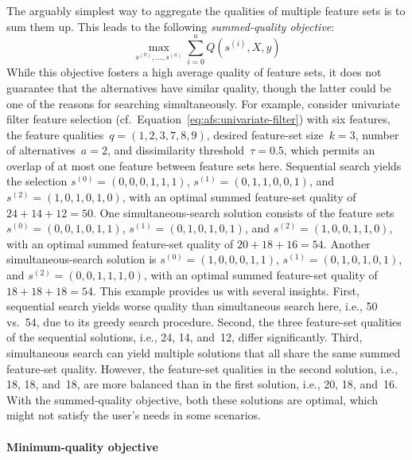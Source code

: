 \documentclass{article}
\theoremstyle{definition}
\begin{document}
The arguably simplest way to aggregate the qualities of multiple feature sets is to sum them up.
This leads to the following \emph{summed-quality objective}:
%
\begin{equation}
	\max_{s^{(0)}, \dots, s^{(a)}} \sum_{i=0}^a Q(s^{(i)},X,y)
	\label{eq:afs:afs-simultaneous-sum-objective}
\end{equation}
%
While this objective fosters a high average quality of feature sets, it does not guarantee that the alternatives have similar quality, though the latter could be one of the reasons for searching simultaneously.
For example, consider univariate filter feature selection (cf.~Equation~\ref{eq:afs:univariate-filter}) with six features, the feature qualities~$q = (1,2,3,7,8,9)$, desired feature-set size~$k=3$, number of alternatives~$a=2$, and dissimilarity threshold~$\tau = 0.5$, which permits an overlap of at most one feature between feature sets here.
Sequential search yields the selection $s^{(0)} = (0,0,0,1,1,1)$, $s^{(1)} = (0,1,1,0,0,1)$, and $s^{(2)} = (1,0,1,0,1,0)$, with an optimal summed feature-set quality of $24+14+12=50$.
One simultaneous-search solution consists of the feature sets $s^{(0)} = (0,0,1,0,1,1)$, $s^{(1)} = (0,1,0,1,0,1)$, and $s^{(2)} = (1,0,0,1,1,0)$, with an optimal summed feature-set quality of $20+18+16=54$.
Another simultaneous-search solution is $s^{(0)} = (1,0,0,0,1,1)$, $s^{(1)} = (0,1,0,1,0,1)$, and $s^{(2)} = (0,0,1,1,1,0)$, with an optimal summed feature-set quality of $18+18+18=54$.
This example provides us with several insights.
First, sequential search yields worse quality than simultaneous search here, i.e., 50 vs.~54, due to its greedy search procedure.
Second, the three feature-set qualities of the sequential solutions, i.e., 24, 14, and~12, differ significantly.
Third, simultaneous search can yield multiple solutions that all share the same summed feature-set quality.
However, the feature-set qualities in the second solution, i.e., 18, 18, and~18, are more balanced than in the first solution, i.e., 20, 18, and~16.
With the summed-quality objective, both these solutions are optimal, which might not satisfy the user's needs in some scenarios.

\paragraph{Minimum-quality objective}
\end{document}
